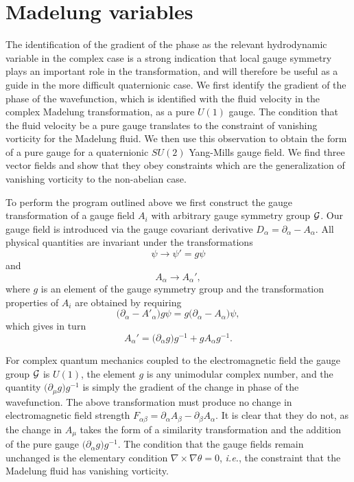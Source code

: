 \documentclass[a4paper,aps,prd,preprint,groupedaddress]{revtex4}
\begin{document}
\section{Madelung variables}

The identification of the gradient of the phase as the relevant hydrodynamic variable in the complex case is a strong indication that  local gauge symmetry plays an important role in the transformation, and will therefore be useful as a guide in the more difficult quaternionic case.  We first identify the gradient of the phase of the wavefunction, which is identified with the fluid velocity in the complex Madelung transformation, as a pure $U(1)$ gauge. The condition that the fluid velocity be a pure gauge translates to the constraint of vanishing vorticity for the Madelung fluid. We then use this observation to obtain the form of a pure gauge for a quaternionic $SU(2)$ Yang-Mills gauge field. We find three vector fields and show that they obey constraints which are the generalization of vanishing vorticity to the non-abelian case.

To perform the program outlined above we first construct the gauge transformation of a gauge field $A_i$ with arbitrary gauge symmetry group ${\cal G}$. Our gauge field is introduced via the gauge covariant derivative $D_\alpha=\partial_\alpha - A_\alpha$. All physical quantities are invariant under the transformations
\begin{equation}
\psi \rightarrow \psi'=g\psi
\end{equation}
and
\begin{equation}
A_\alpha \rightarrow A_\alpha',
\end{equation}
where $g$ is an element of the gauge symmetry group and the transformation properties of $A_i$ are obtained by requiring
\begin{equation}
\bigl(\partial_\alpha - A'_\alpha\bigr)g\psi = g\bigl(\partial_\alpha- A_\alpha\bigr)\psi,
\end{equation}
which gives in turn
\begin{equation}
A_\alpha'=\bigl(\partial_\alpha g\bigr)g^{-1} + gA_\alpha g^{-1}.
\end{equation}

For complex quantum mechanics coupled to the electromagnetic field the gauge group ${\cal G}$ is $U(1)$, the element $g$ is any unimodular complex number, and the quantity $\bigl(\partial_\mu g\bigr)g^{-1}$ is simply the gradient of the change in phase of the wavefunction. The above transformation must produce no change in electromagnetic field strength $F_{\alpha\beta} = \partial_\alpha A_\beta - \partial_\beta A_\alpha$. It is clear that they do not, as the change in $A_\mu$ takes the form of a similarity transformation and the addition of the pure gauge $\bigl(\partial_\alpha g\bigr)g^{-1}$. The condition that the gauge fields remain unchanged is the elementary condition $\nabla\times\nabla\theta =0$, {\it i.e.}, the constraint that the Madelung fluid has vanishing vorticity.
 
\end{document}
